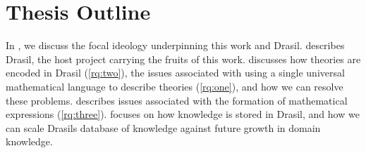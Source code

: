 \section{Thesis Outline}
\label{sec:intro:outline}

In , we discuss the focal ideology underpinning this work
and Drasil.  describes Drasil, the host project carrying the
fruits of this work.  discusses how theories are encoded
in Drasil (\ref{rq:two}), the issues associated with using a single universal
mathematical language to describe theories (\ref{rq:one}), and how we can
resolve these problems.  describes issues associated with
the formation of mathematical expressions (\ref{rq:three}).
 focuses on how knowledge is stored in Drasil, and how
we can scale Drasils database of knowledge against future growth in domain
knowledge.
